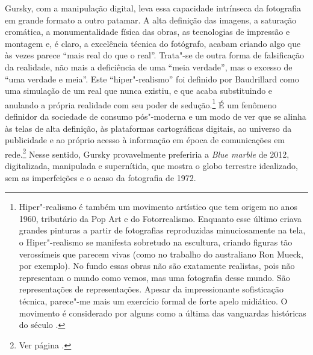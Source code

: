 Gursky, com a manipulação digital, leva essa capacidade intrínseca da
fotografia em grande formato a outro patamar. A alta definição das
imagens, a saturação cromática, a monumentalidade física das obras, as
tecnologias de impressão e montagem e, é claro, a excelência técnica do
fotógrafo, acabam criando algo que às vezes parece ``mais real do que o
real''. Trata"-se de outra forma de falsificação da realidade, não mais a
deficiência de uma ``meia verdade'', mas o excesso de ``uma verdade e
meia''. Este ``hiper"-realismo'' foi definido por Baudrillard como uma
simulação de um real que nunca existiu, e que acaba substituindo e
anulando a própria realidade com seu poder de sedução.\footnote{Hiper"-realismo
  é também um movimento artístico que tem origem no anos 1960,
  tributário da Pop Art e do Fotorrealismo. Enquanto esse último
  criava grandes pinturas a partir de fotografias reproduzidas
  minuciosamente na tela, o Hiper"-realismo se manifesta sobretudo na
  escultura, criando figuras tão verossímeis que parecem vivas (como no
  trabalho do australiano Ron Mueck, por exemplo). No fundo essas obras não são exatamente realistas, pois não representam o mundo como vemos, mas uma fotografia desse mundo. São representações de representações. Apesar da impressionante sofisticação técnica, parece"-me mais um exercício formal de forte apelo midiático. O movimento é considerado por alguns como a última das vanguardas históricas do século .} É um fenômeno definidor da sociedade de
consumo pós"-moderna e um modo de ver que se alinha às telas de alta
definição, às plataformas cartográficas digitais, ao universo da
publicidade e ao próprio acesso à informação em época de comunicações em
rede.\footnote{Ver página \pageref{hiperreal}.} Nesse sentido, Gursky
provavelmente preferiria a \emph{Blue marble} de 2012, digitalizada,
manipulada e supernítida, que mostra o globo terrestre idealizado, sem
as imperfeições e o acaso da fotografia de 1972.

